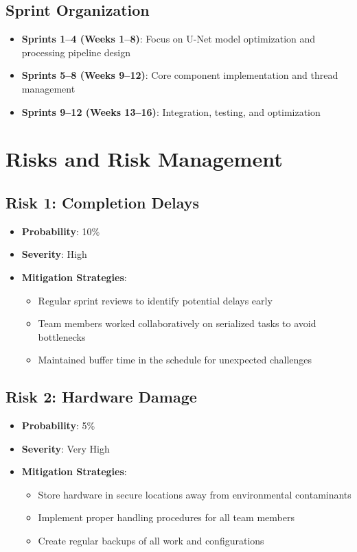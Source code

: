 \subsection{Sprint Organization}
\begin{itemize}
\item \textbf{Sprints 1--4 (Weeks 1--8)}: Focus on U-Net model optimization and processing pipeline design
\item \textbf{Sprints 5--8 (Weeks 9--12)}: Core component implementation and thread management
\item \textbf{Sprints 9--12 (Weeks 13--16)}: Integration, testing, and optimization
\end{itemize}

\section{Risks and Risk Management}\label{sec:risk-management}

\subsection{Risk 1: Completion Delays}
\begin{itemize}
\item \textbf{Probability}: 10\%
\item \textbf{Severity}: High
\item \textbf{Mitigation Strategies}:
  \begin{itemize}
  \item Regular sprint reviews to identify potential delays early
  \item Team members worked collaboratively on serialized tasks to avoid bottlenecks
  \item Maintained buffer time in the schedule for unexpected challenges
  \end{itemize}
\end{itemize}

\subsection{Risk 2: Hardware Damage}
\begin{itemize}
\item \textbf{Probability}: 5\%
\item \textbf{Severity}: Very High
\item \textbf{Mitigation Strategies}:
  \begin{itemize}
  \item Store hardware in secure locations away from environmental contaminants
  \item Implement proper handling procedures for all team members
  \item Create regular backups of all work and configurations
  \end{itemize}
\end{itemize}

